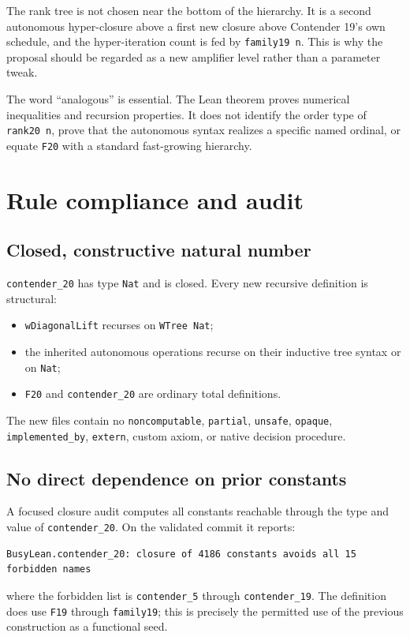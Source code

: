 \documentclass[11pt]{article}
\theoremstyle{definition}
\newcommand{\code}[1]{\texttt{#1}}
\begin{document}
The rank tree is not chosen near the bottom of the hierarchy.  It is a second
autonomous hyper-closure above a first new closure above Contender 19's own
schedule, and the hyper-iteration count is fed by \code{family19 n}.  This is
why the proposal should be regarded as a new amplifier level rather than a
parameter tweak.

The word ``analogous'' is essential.  The Lean theorem proves numerical
inequalities and recursion properties.  It does not identify the order type of
\code{rank20 n}, prove that the autonomous syntax realizes a specific named
ordinal, or equate \code{F20} with a standard fast-growing hierarchy.

\section{Rule compliance and audit}

\subsection{Closed, constructive natural number}

\code{contender\_20} has type \code{Nat} and is closed.  Every new recursive
definition is structural:
\begin{itemize}[leftmargin=2em]
  \item \code{wDiagonalLift} recurses on \code{WTree Nat};
  \item the inherited autonomous operations recurse on their inductive tree
        syntax or on \code{Nat};
  \item \code{F20} and \code{contender\_20} are ordinary total definitions.
\end{itemize}
The new files contain no \code{noncomputable}, \code{partial}, \code{unsafe},
\code{opaque}, \code{implemented\_by}, \code{extern}, custom axiom, or native
decision procedure.

\subsection{No direct dependence on prior constants}

A focused closure audit computes all constants reachable through the type and
value of \code{contender\_20}.  On the validated commit it reports:
\begin{lstlisting}[basicstyle=\ttfamily\small]
BusyLean.contender_20: closure of 4186 constants avoids all 15 forbidden names
\end{lstlisting}
where the forbidden list is \code{contender\_5} through
\code{contender\_19}.  The definition does use \code{F19} through
\code{family19}; this is precisely the permitted use of the previous
construction as a functional seed.
\end{document}
